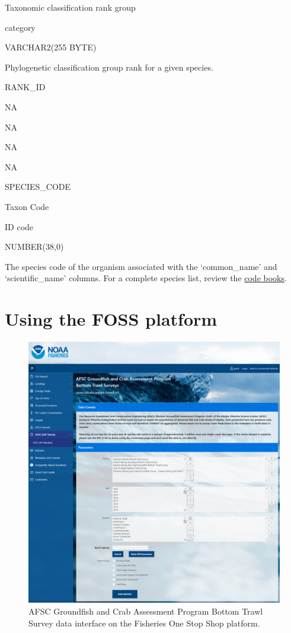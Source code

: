 \documentclass[
  letterpaper,
  oneside,
  open=any]{scrbook}
\begin{document}
Taxonomic classification rank group

category

VARCHAR2(255 BYTE)

Phylogenetic classification group rank for a given species.

RANK\_ID

NA

NA

NA

NA

SPECIES\_CODE

Taxon Code

ID code

NUMBER(38,0)

The species code of the organism associated with the `common\_name' and
`scientific\_name' columns. For a complete species list, review the
\href{https://www.fisheries.noaa.gov/resource/document/groundfish-survey-species-code-manual-and-data-codes-manual}{code
books}.

\hypertarget{using-the-foss-platform}{%
\chapter{Using the FOSS platform}\label{using-the-foss-platform}}

\begin{figure}

{\centering \includegraphics[width=6.24in,height=\textheight]{content/../img/foss_1_interface.png}

}

\caption{AFSC Groundfish and Crab Assessment Program Bottom Trawl Survey
data interface on the Fisheries One Stop Shop platform.}

\end{figure}
\end{document}
